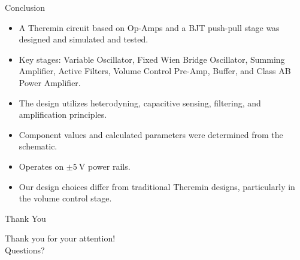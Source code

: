 \documentclass[10pt,xcolor={table,dvipsnames},t]{beamer}
\begin{document}
\begin{frame}{Conclusion}
\begin{itemize}
    \item A Theremin circuit based on Op-Amps and a BJT push-pull stage was designed and simulated and tested.
    \item Key stages: Variable Oscillator, Fixed Wien Bridge Oscillator, Summing Amplifier, Active Filters, Volume Control Pre-Amp, Buffer, and Class AB Power Amplifier.
    \item The design utilizes heterodyning, capacitive sensing, filtering, and amplification principles.
    \item Component values and calculated parameters were determined from the schematic.
    \item Operates on $\pm \SI{5}{\volt}$ power rails.
    \item Our design choices differ from traditional Theremin designs, particularly in the volume control stage.
\end{itemize}
\end{frame}

\begin{frame}{Thank You}
\begin{center}
    \Large Thank you for your attention!\\
    \vspace{1cm}
    Questions?
\end{center}
\end{frame}
\end{document}
